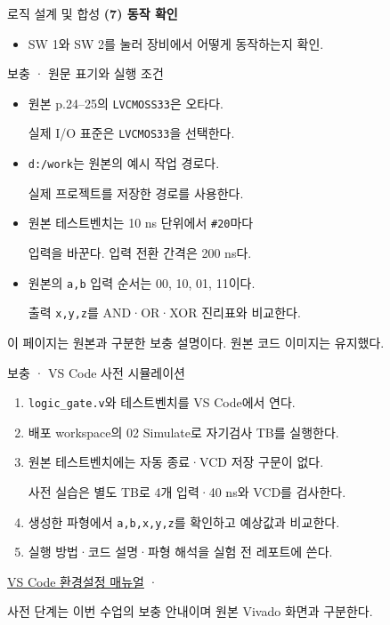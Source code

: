 \begin{frame}[label=legacy-01-p52]{로직 설계 및 합성}
\small
{\color{UOSBlue}\bfseries (7) 동작 확인}\par\vspace{0.12cm}
\begin{itemize}
\setlength{\itemsep}{0.08cm}
\item {SW 1와 SW 2를 눌러 장비에서 어떻게 동작하는지 확인.}
\end{itemize}
\end{frame}

\begin{frame}[label=legacy-01-notes]{보충 · 원문 표기와 실행 조건}
\small

\begin{itemize}
\setlength{\itemsep}{0.3cm}
\item 원본 p.24--25의 \texttt{LVCMOSS33}은 오타다.\par
실제 I/O 표준은 \texttt{LVCMOS33}을 선택한다.
\item \texttt{d:/work}는 원본의 예시 작업 경로다.\par
실제 프로젝트를 저장한 경로를 사용한다.
\item 원본 테스트벤치는 10 ns 단위에서 \texttt{\#20}마다\par
입력을 바꾼다. 입력 전환 간격은 200 ns다.
\item 원본의 \texttt{a,b} 입력 순서는 00, 10, 01, 11이다.\par
출력 \texttt{x,y,z}를 AND·OR·XOR 진리표와 비교한다.
\end{itemize}
\vspace{0.3cm}
{\scriptsize 이 페이지는 원본과 구분한 보충 설명이다. 원본 코드 이미지는 유지했다.}

\end{frame}

\begin{frame}[label=legacy-01-prelab]{보충 · VS Code 사전 시뮬레이션}
\small

\begin{enumerate}
\setlength{\itemsep}{0.23cm}
\item \texttt{logic\_gate.v}와 테스트벤치를 VS Code에서 연다.
\item 배포 workspace의 02 Simulate로 자기검사 TB를 실행한다.
\item 원본 테스트벤치에는 자동 종료·VCD 저장 구문이 없다.\par
사전 실습은 별도 TB로 4개 입력·40 ns와 VCD를 검사한다.
\item 생성한 파형에서 \texttt{a,b,x,y,z}를 확인하고 예상값과 비교한다.
\item 실행 방법·코드 설명·파형 해석을 실험 전 레포트에 쓴다.
\end{enumerate}
\vspace{0.3cm}
{\scriptsize \href{02.vscode_verilog_환경설정_매뉴얼.pdf}{VS Code 환경설정 매뉴얼} ·
\par
사전 단계는 이번 수업의 보충 안내이며 원본 Vivado 화면과 구분한다.}

\end{frame}

